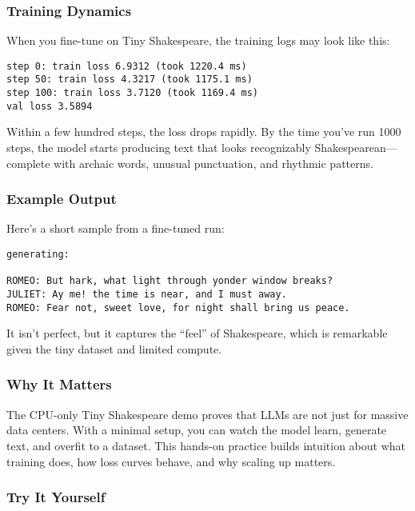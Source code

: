 \documentclass[
  letterpaper,
  DIV=11,
  numbers=noendperiod]{scrreprt}
\begin{document}
\subsubsection{Training Dynamics}\label{training-dynamics-2}

When you fine-tune on Tiny Shakespeare, the training logs may look like
this:

\begin{verbatim}
step 0: train loss 6.9312 (took 1220.4 ms)
step 50: train loss 4.3217 (took 1175.1 ms)
step 100: train loss 3.7120 (took 1169.4 ms)
val loss 3.5894
\end{verbatim}

Within a few hundred steps, the loss drops rapidly. By the time you've
run 1000 steps, the model starts producing text that looks recognizably
Shakespearean---complete with archaic words, unusual punctuation, and
rhythmic patterns.

\subsubsection{Example Output}\label{example-output}

Here's a short sample from a fine-tuned run:

\begin{verbatim}
generating:

ROMEO: But hark, what light through yonder window breaks?
JULIET: Ay me! the time is near, and I must away.
ROMEO: Fear not, sweet love, for night shall bring us peace.
\end{verbatim}

It isn't perfect, but it captures the ``feel'' of Shakespeare, which is
remarkable given the tiny dataset and limited compute.

\subsubsection{Why It Matters}\label{why-it-matters-69}

The CPU-only Tiny Shakespeare demo proves that LLMs are not just for
massive data centers. With a minimal setup, you can watch the model
learn, generate text, and overfit to a dataset. This hands-on practice
builds intuition about what training does, how loss curves behave, and
why scaling up matters.

\subsubsection{Try It Yourself}\label{try-it-yourself-83}
\end{document}
